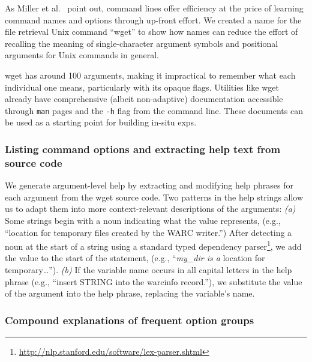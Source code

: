 \begin{changes}
As Miller et al.~\cite{miller_inky_2008} point out, command lines offer efficiency at the price of learning command names and options through up-front effort.
We created a \Gls{name} for the file retrieval Unix command ``wget'' to show how \Glspl{name} can reduce the effort of recalling the meaning of single-character argument symbols and positional arguments for Unix commands in general.
\end{changes}
wget has around 100 arguments, making it impractical to remember what each individual one means, particularly with its opaque flags.
Utilities like wget already have comprehensive (albeit non-adaptive) documentation accessible through \texttt{man} pages and the \texttt{-h} flag from the command line.
These documents can be used as a starting point for building in-situ \glspl{exp}.

\subsubsection{Listing command options and extracting help text from source code}

We generate argument-level help by extracting and modifying help phrases for each argument from the wget source code.
Two patterns in the help strings allow us to adapt them into more context-relevant descriptions of the arguments:
\emph{(a)} Some strings begin with a noun indicating what the value represents, (e.g., ``location for temporary files created by the WARC writer.'')
After detecting a noun at the start of a string using a standard typed dependency parser\footnote{\url{http://nlp.stanford.edu/software/lex-parser.shtml}}, we add the value to the start of the statement, (e.g., ``\emph{my\_dir is a} location for temporary\dots{}'').
\emph{(b)} If the variable name occurs in all capital letters in the help phrase (e.g., ``insert STRING into the warcinfo record.''), we substitute the value of the argument into the help phrase, replacing the variable's name.

\subsubsection{Compound explanations of frequent option groups}

